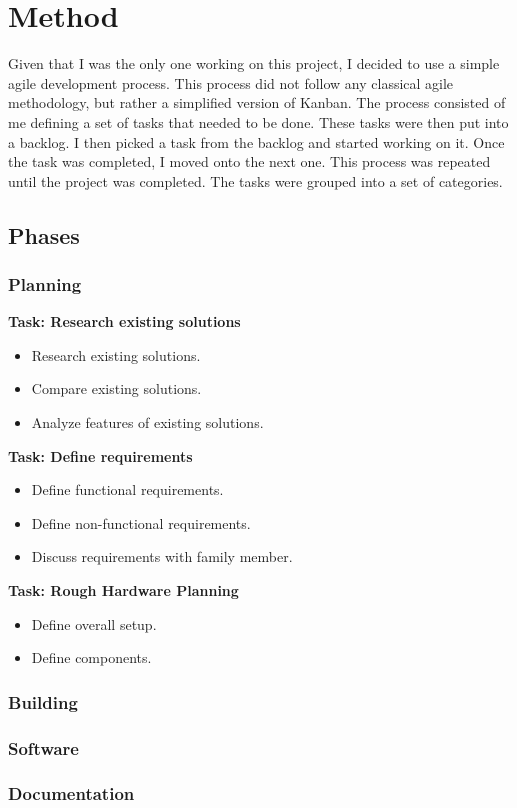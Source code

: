 \section{Method}
Given that I was the only one working on this project, I decided to use a simple agile development process. This process did not follow any classical agile methodology, but rather a simplified version of Kanban. The process consisted of me defining a set of tasks that needed to be done. These tasks were then put into a backlog. I then picked a task from the backlog and started working on it. Once the task was completed, I moved onto the next one. This process was repeated until the project was completed.
The tasks were grouped into a set of categories.

\subsection{Phases}

\subsubsection{Planning}
\textbf{Task: Research existing solutions}
\begin{itemize}
    \item Research existing solutions.
    \item Compare existing solutions.
    \item Analyze features of existing solutions.
\end{itemize}

\textbf{Task: Define requirements}
\begin{itemize}
    \item Define functional requirements.
    \item Define non-functional requirements.
    \item Discuss requirements with family member.
\end{itemize}

\textbf{Task: Rough Hardware Planning}
\begin{itemize}
    \item Define overall setup.
    \item Define components.
\end{itemize}
\subsubsection{Building}

\subsubsection{Software}

\subsubsection{Documentation}